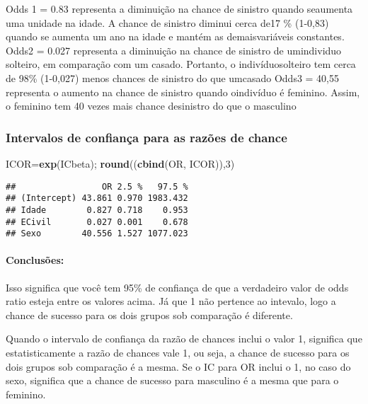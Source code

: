 \documentclass[
]{article}
\newenvironment{Shaded}{\begin{snugshade}}{\end{snugshade}}
\newcommand{\DecValTok}[1]{\textcolor[rgb]{0.00,0.00,0.81}{#1}}
\newcommand{\FunctionTok}[1]{\textcolor[rgb]{0.13,0.29,0.53}{\textbf{#1}}}
\newcommand{\NormalTok}[1]{#1}
\newcommand{\OtherTok}[1]{\textcolor[rgb]{0.56,0.35,0.01}{#1}}
\begin{document}
Odds 1 = 0.83 representa a diminuição na chance de sinistro quando
seaumenta uma unidade na idade. A chance de sinistro diminui cerca de17
\% (1-0,83) quando se aumenta um ano na idade e mantém as
demaisvariáveis constantes. Odds2 = 0.027 representa a diminuição na
chance de sinistro de umindividuo solteiro, em comparação com um casado.
Portanto, o indivíduosolteiro tem cerca de 98\% (1-0,027) menos chances
de sinistro do que umcasado Odds3 = 40,55 representa o aumento na chance
de sinistro quando oindivíduo é feminino. Assim, o feminino tem 40 vezes
mais chance desinistro do que o masculino

\hypertarget{intervalos-de-confianuxe7a-para-as-razuxf5es-de-chance}{%
\subsubsection{Intervalos de confiança para as razões de
chance}\label{intervalos-de-confianuxe7a-para-as-razuxf5es-de-chance}}

\begin{Shaded}
\begin{Highlighting}[]
\NormalTok{ICOR}\OtherTok{=}\FunctionTok{exp}\NormalTok{(ICbeta);}
\FunctionTok{round}\NormalTok{((}\FunctionTok{cbind}\NormalTok{(OR, ICOR)),}\DecValTok{3}\NormalTok{)}
\end{Highlighting}
\end{Shaded}

\begin{verbatim}
##                 OR 2.5 %   97.5 %
## (Intercept) 43.861 0.970 1983.432
## Idade        0.827 0.718    0.953
## ECivil       0.027 0.001    0.678
## Sexo        40.556 1.527 1077.023
\end{verbatim}

\hypertarget{conclusuxf5es-16}{%
\paragraph{Conclusões:}\label{conclusuxf5es-16}}

Isso significa que você tem 95\% de confiança de que a verdadeiro valor
de odds ratio esteja entre os valores acima. Já que 1 não pertence ao
intevalo, logo a chance de sucesso para os dois grupos sob comparação é
diferente.

Quando o intervalo de confiança da razão de chances inclui o valor 1,
significa que estatisticamente a razão de chances vale 1, ou seja, a
chance de sucesso para os dois grupos sob comparação é a mesma. Se o IC
para OR inclui o 1, no caso do sexo, significa que a chance de sucesso
para masculino é a mesma que para o feminino.
\end{document}
